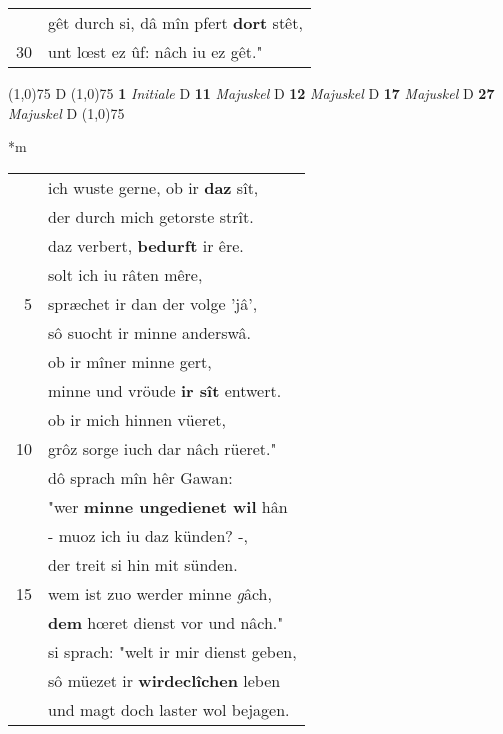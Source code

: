 \documentclass[8pt,a4paper,notitlepage]{article}
\begin{document}
\begin{table}[ht]
\begin{minipage}[t]{0.5\linewidth}
\begin{tabular}{rl}
 & gêt durch si, dâ mîn pfert \textbf{dort} stêt,\\ 
30 & unt lœst ez ûf: nâch iu ez gêt."\\ 
\end{tabular}
\scriptsize
\line(1,0){75} \newline
D \newline
\line(1,0){75} \newline
\textbf{1} \textit{Initiale} D  \textbf{11} \textit{Majuskel} D  \textbf{12} \textit{Majuskel} D  \textbf{17} \textit{Majuskel} D  \textbf{27} \textit{Majuskel} D  \newline
\line(1,0){75} \newline
\newline
\end{minipage}
\hspace{0.5cm}
\begin{minipage}[t]{0.5\linewidth}
\small
\begin{center}*m
\end{center}
\begin{tabular}{rl}
 & ich wuste gerne, ob ir \textbf{daz} sît,\\ 
 & der durch mich getorste strît.\\ 
 & daz verbert, \textbf{bedurft} ir êre.\\ 
 & solt ich iu râten mêre,\\ 
5 & spræchet ir dan der volge 'jâ',\\ 
 & sô suocht ir minne anderswâ.\\ 
 & ob ir mîner minne gert,\\ 
 & minne und vröude \textbf{ir sît} entwert.\\ 
 & ob ir mich hinnen vüeret,\\ 
10 & grôz sorge iuch dar nâch rüeret."\\ 
 & dô sprach mîn hêr Gawan:\\ 
 & "wer \textbf{minne ungedienet wil} hân\\ 
 & - muoz ich iu daz künden? -,\\ 
 & der treit si hin mit sünden.\\ 
15 & wem ist zuo werder minne \textit{g}âch,\\ 
 & \textbf{dem} hœret dienst vor und nâch."\\ 
 & si sprach: "welt ir mir dienst geben,\\ 
 & sô müezet ir \textbf{wirdeclîchen} leben\\ 
 & und magt doch laster wol bejagen.\\ 

\end{tabular}
\end{minipage}
\end{table}
\end{document}
